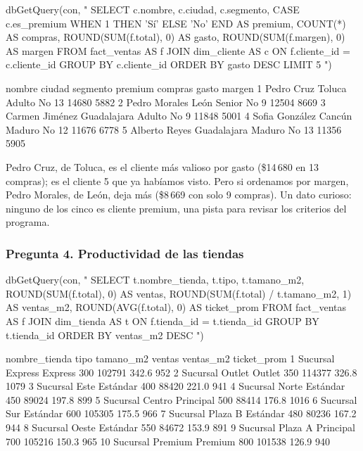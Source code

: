 \begin{rcode}
dbGetQuery(con, "
  SELECT c.nombre, c.ciudad, c.segmento,
         CASE c.es_premium WHEN 1 THEN 'Sí' ELSE 'No' END AS premium,
         COUNT(*)               AS compras,
         ROUND(SUM(f.total), 0) AS gasto,
         ROUND(SUM(f.margen), 0) AS margen
  FROM fact_ventas AS f
  JOIN dim_cliente AS c ON f.cliente_id = c.cliente_id
  GROUP BY c.cliente_id
  ORDER BY gasto DESC
  LIMIT 5
")
\end{rcode}

\begin{rsalida}
          nombre      ciudad segmento premium compras gasto margen
1     Pedro Cruz      Toluca   Adulto      No      13 14680   5882
2  Pedro Morales        León   Senior      No       9 12504   8669
3 Carmen Jiménez Guadalajara   Adulto      No       9 11848   5001
4 Sofia González      Cancún   Maduro      No      12 11676   6778
5  Alberto Reyes Guadalajara   Maduro      No      13 11356   5905
\end{rsalida}

Pedro Cruz, de Toluca, es el cliente más valioso por gasto (\$14\,680 en 13
compras); es el cliente 5 que ya habíamos visto. Pero si ordenamos por
margen, Pedro Morales, de León, deja más (\$8\,669 con solo 9 compras). Un
dato curioso: ninguno de los cinco es cliente premium, una pista para
revisar los criterios del programa.

\subsubsection{Pregunta 4. Productividad de las tiendas}

\begin{rcode}
dbGetQuery(con, "
  SELECT t.nombre_tienda, t.tipo, t.tamano_m2,
         ROUND(SUM(f.total), 0)               AS ventas,
         ROUND(SUM(f.total) / t.tamano_m2, 1) AS ventas_m2,
         ROUND(AVG(f.total), 0)               AS ticket_prom
  FROM fact_ventas AS f
  JOIN dim_tienda AS t ON f.tienda_id = t.tienda_id
  GROUP BY t.tienda_id
  ORDER BY ventas_m2 DESC
")
\end{rcode}

\begin{rsalida}
      nombre_tienda      tipo tamano_m2 ventas ventas_m2 ticket_prom
1  Sucursal Express   Express       300 102791     342.6         952
2   Sucursal Outlet    Outlet       350 114377     326.8        1079
3     Sucursal Este  Estándar       400  88420     221.0         941
4    Sucursal Norte  Estándar       450  89024     197.8         899
5   Sucursal Centro Principal       500  88414     176.8        1016
6      Sucursal Sur  Estándar       600 105305     175.5         966
7  Sucursal Plaza B  Estándar       480  80236     167.2         944
8    Sucursal Oeste  Estándar       550  84672     153.9         891
9  Sucursal Plaza A Principal       700 105216     150.3         965
10 Sucursal Premium   Premium       800 101538     126.9         940
\end{rsalida}

